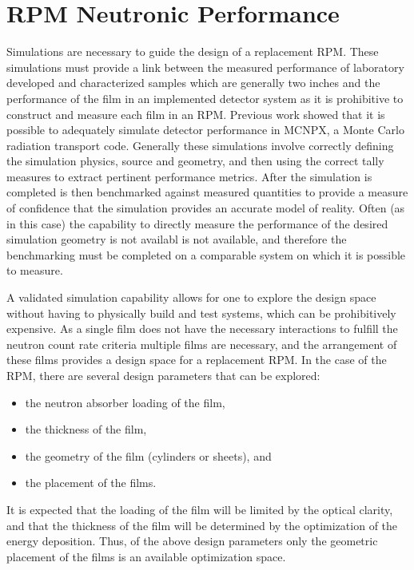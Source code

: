 \section{RPM Neutronic Performance}
\label{sec:RPMNP}

Simulations are necessary to guide the design of a replacement RPM.
These simulations must provide a link between the measured performance of laboratory developed and characterized samples which are generally two inches and the performance of the film in an implemented detector system as it is prohibitive to construct and measure each film in an RPM.
Previous work showed that it is possible to adequately simulate detector performance in MCNPX, a Monte Carlo radiation transport code.
Generally these simulations involve correctly defining the simulation physics, source and geometry, and then using the correct tally measures to extract pertinent performance metrics.
After the simulation is completed is then benchmarked against measured quantities to provide a measure of confidence that the simulation provides an accurate model of reality.
Often (as in this case) the capability to directly measure the performance of the desired simulation geometry is not availabl is not available, and therefore the benchmarking must be completed on a comparable system on which it is possible to measure.

A validated simulation capability allows for one to explore the design space without having to physically build and test systems, which can be prohibitively expensive.
As a single film does not have the necessary interactions to fulfill the neutron count rate criteria multiple films are necessary, and the arrangement of these films provides a design space for a replacement RPM.
In the case of the RPM, there are several design parameters that can be explored:
\begin{itemize}
  \item the neutron absorber loading of the film,
  \item the thickness of the film,
  \item the geometry of the film (cylinders or sheets), and
  \item the placement of the films.
\end{itemize}
It is expected that the loading of the film will be limited by the optical clarity, and that the thickness of the film will be determined by the optimization of the energy deposition.
Thus, of the above design parameters only the geometric placement of the films is an available optimization space.

